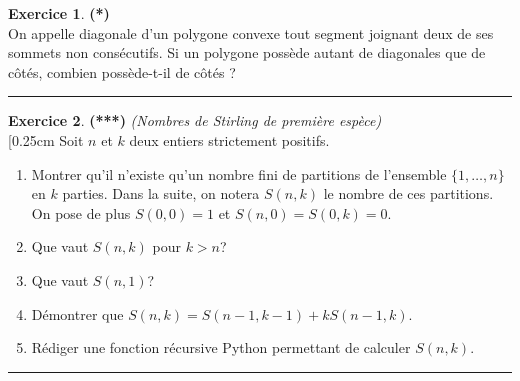\documentclass[a4paper,11pt]{article}
\theoremstyle{definition}
\newtheorem{exo}{Exercice} %
\begin{document}
	


\begin{exo}\textbf{(*)}\quad\\[0.25cm]
	On appelle diagonale d’un
	polygone convexe tout segment joignant deux de ses sommets non
	consécutifs. Si un polygone possède autant de diagonales que de côtés, combien possède-t-il de côtés ?
	
	\centering
\rule{1\linewidth}{0.6pt}
\end{exo}

\begin{exo}\textbf{(***)} \quad\textit{(Nombres de Stirling de première espèce)}\\[0.25cm%
Soit $n$ et $k$ deux entiers strictement positifs. 
\begin{enumerate}
	\item Montrer qu’il n’existe qu’un nombre fini de partitions de l’ensemble $\{1,\dots,n\}$ en $k$ parties. Dans la suite, on notera $S(n,k)$ le nombre de ces partitions. On pose de plus $S(0,0)=1$ et $S(n,0)=S(0,k)=0$.
	\item Que vaut $S(n,k)$ pour $k>n$?
	\item Que vaut $S(n,1)$?
	\item Démontrer que $S(n,k)=S(n-1,k-1)+kS(n-1,k)$.
	\item Rédiger une fonction récursive Python permettant de calculer $S(n,k)$.
\end{enumerate}

	\centering
	\rule{1\linewidth}{0.6pt}
\end{exo}
\end{document}
